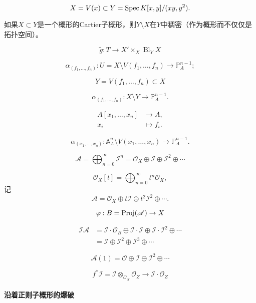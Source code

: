 \[
	X=V(x)\subset Y=\operatorname{Spec} K[x,y]/(xy,y^2).
\]

\begin{lem}\label{lem:4.19}
	如果$X\subset Y$是一个概形的Cartier子概形，则$Y\setminus X$在$Y$中稠密（作为概形而不仅仅是拓扑空间）。
\end{lem}



\[
	\tilde g:T\to X'\times_X \operatorname{Bl}_Y X
\]

\[
	\alpha_{(f_1,\dots,f_n)}:U=X\setminus V(f_1,\dots,f_n)\longrightarrow \mathbb P_A^{n-1};
\]

\[
	Y=V(f_1,\dots,f_n)\subset X
\]

\[
	\alpha_{(f_1,\dots,f_n)}:X\setminus Y\longrightarrow \mathbb P_A^{n-1}.
\]

\[
	\begin{aligned}
		A\left[x_1,\dots,x_n\right] & \longrightarrow A,\\
		x_i &\longmapsto f_i.
	\end{aligned}
\]

\[
	\alpha_{(x_1,\dots,x_n)}:\mathbb A_A^n\setminus V(x_1,\dots,x_n)\longrightarrow \mathbb P_A^{n-1}.
\]


\[
	\mathscr A=\bigoplus_{n=0}^\infty \mathscr I^n=\mathscr O_X\oplus \mathscr I\oplus \mathscr I^2\oplus \cdots
\]

\[
	\mathscr O_X[t]=\bigoplus_{n=0}^\infty t^n\mathscr O_X,
\]
记
\[
	\mathscr A=\mathscr O_X\oplus t\mathscr I\oplus t^2\mathscr I^2\oplus \cdots.
\]

\[
	\varphi:B=\operatorname{Proj}(\mathscr A)\to X
\]

\[
	\begin{aligned}
	\mathscr I\mathscr A&=\mathscr I\cdot \mathscr O_B\oplus \mathscr I\cdot \mathscr I\oplus \mathscr I\cdot \mathscr I^2 \oplus \cdots\\
	&=\mathscr I\oplus \mathscr I^2 \oplus \mathscr I^3\oplus \cdots
	\end{aligned}
\]

\[
	\mathscr A(1)=\mathscr O\oplus \mathscr I \oplus \mathscr I^2\oplus \cdots
\]


\[
	f^*\mathscr I=\mathscr I\otimes_{\mathscr O_X}\mathscr O_Z\to \mathscr I\cdot \mathscr O_Z
\]

\paragraph*{沿着正则子概形的爆破}

